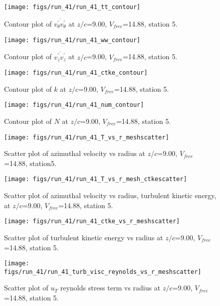 \begin{figure}[H]
\centering
\texttt{[image: figs/run\_41/run\_41\_tt\_contour]}
\caption{Contour plot of $\overline{v_{\theta}^{\prime} v_{\theta}^{\prime}}$ at $z/c$=9.00, $V_{free}$=14.88, station 5.}
\end{figure}


\begin{figure}[H]
\centering
\texttt{[image: figs/run\_41/run\_41\_ww\_contour]}
\caption{Contour plot of $\overline{v_{z}^{\prime} v_{z}^{\prime}}$ at $z/c$=9.00, $V_{free}$=14.88, station 5.}
\end{figure}


\begin{figure}[H]
\centering
\texttt{[image: figs/run\_41/run\_41\_ctke\_contour]}
\caption{Contour plot of $k$ at $z/c$=9.00, $V_{free}$=14.88, station 5.}
\end{figure}


\begin{figure}[H]
\centering
\texttt{[image: figs/run\_41/run\_41\_num\_contour]}
\caption{Contour plot of $N$ at $z/c$=9.00, $V_{free}$=14.88, station 5.}
\end{figure}


\begin{figure}[H]
\centering
\texttt{[image: figs/run\_41/run\_41\_T\_vs\_r\_meshscatter]}
\caption{Scatter plot of azimuthal velocity vs radius at $z/c$=9.00, $V_{free}$=14.88, station5.}
\end{figure}


\begin{figure}[H]
\centering
\texttt{[image: figs/run\_41/run\_41\_T\_vs\_r\_mesh\_ctkescatter]}
\caption{Scatter plot of azimuthal velocity vs radius, turbulent kinetic energy, at $z/c$=9.00, $V_{free}$=14.88, station 5.}
\end{figure}


\begin{figure}[H]
\centering
\texttt{[image: figs/run\_41/run\_41\_ctke\_vs\_r\_meshscatter]}
\caption{Scatter plot of turbulent kinetic energy vs radius at $z/c$=9.00, $V_{free}$=14.88, station 5.}
\end{figure}


\begin{figure}[H]
\centering
\texttt{[image: figs/run\_41/run\_41\_turb\_visc\_reynolds\_vs\_r\_meshscatter]}
\caption{Scatter plot of $
u_T$ reynolds stress term vs radius at $z/c$=9.00, $V_{free}$=14.88, station 5.}
\end{figure}


